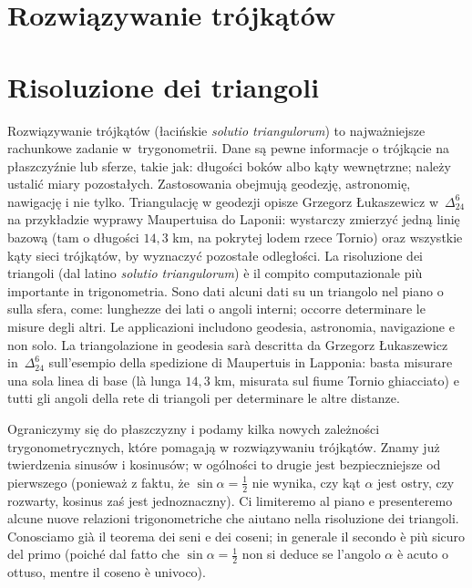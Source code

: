
%

\section{Rozwiązywanie trójkątów} %
\section{Risoluzione dei triangoli} %


Rozwiązywanie trójkątów (łacińskie \emph{solutio triangulorum}) to najważniejsze rachunkowe zadanie w~trygonometrii. %
Dane są pewne informacje o trójkącie na płaszczyźnie lub sferze, takie jak: długości boków albo kąty wewnętrzne; należy ustalić miary pozostałych. %
Zastosowania obejmują geodezję, astronomię, nawigację i nie tylko. %
Triangulację w geodezji opisze Grzegorz Łukaszewicz w~$\Delta_{24}^{6}$ na przykładzie wyprawy Maupertuisa do Laponii: wystarczy zmierzyć jedną linię bazową (tam o długości $14{,}3$ km, na pokrytej lodem rzece Tornio) oraz wszystkie kąty sieci trójkątów, by wyznaczyć pozostałe odległości. %
La risoluzione dei triangoli (dal latino \emph{solutio triangulorum}) è il compito computazionale più importante in trigonometria. %
Sono dati alcuni dati su un triangolo nel piano o sulla sfera, come: lunghezze dei lati o angoli interni; occorre determinare le misure degli altri. %
Le applicazioni includono geodesia, astronomia, navigazione e non solo. %
La triangolazione in geodesia sarà descritta da Grzegorz Łukaszewicz in~$\Delta_{24}^{6}$ sull'esempio della spedizione di Maupertuis in Lapponia: basta misurare una sola linea di base (là lunga $14{,}3$ km, misurata sul fiume Tornio ghiacciato) e tutti gli angoli della rete di triangoli per determinare le altre distanze. %

Ograniczymy się do płaszczyzny i podamy kilka nowych zależności trygonometrycznych, które pomagają w rozwiązywaniu trójkątów. %
Znamy już twierdzenia sinusów i kosinusów; w ogólności to drugie jest bezpieczniejsze od pierwszego (ponieważ z faktu, że $\sin \alpha = \frac 1 2$ nie wynika, czy kąt $\alpha$ jest ostry, czy rozwarty, kosinus zaś jest jednoznaczny). %
Ci limiteremo al piano e presenteremo alcune nuove relazioni trigonometriche che aiutano nella risoluzione dei triangoli. %
Conosciamo già il teorema dei seni e dei coseni; in generale il secondo è più sicuro del primo (poiché dal fatto che $\sin \alpha = \frac 1 2$ non si deduce se l'angolo $\alpha$ è acuto o ottuso, mentre il coseno è univoco). %

